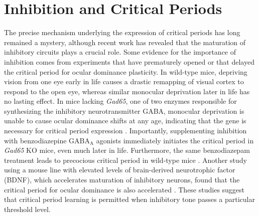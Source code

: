 \section{Inhibition and Critical Periods}
The precise mechanism underlying the expression of critical periods has long remained a mystery, although recent work has revealed that the maturation of inhibitory circuits plays a crucial role. Some evidence for the importance of inhibition comes from experiments that have prematurely opened or that delayed the critical period for ocular dominance plasticity. In wild-type mice, depriving vision from one eye early in life causes a drastic remapping of visual cortex to respond to the open eye, whereas similar monocular deprivation later in life has no lasting effect. In mice lacking \textit{Gad65}, one of two enzymes responsible for synthesizing the inhibitory neurotransmitter GABA, monocular deprivation is unable to cause ocular dominance shifts at any age, indicating that the gene is necessary for critical period expression \cite{Fagiolini2000}. Importantly, supplementing inhibition with benzodiazepine GABA$_\mathrm{A}$ agonists immediately initiates the critical period in \textit{Gad65} KO mice, even much later in life. Furthermore, the same benzodiazepam treatment leads to precocious critical period in wild-type mice \cite{Fagiolini2000}. Another study using a mouse line with elevated levels of brain-derived neurotrophic factor (BDNF), which accelerates maturation of inhibitory neurons, found that the critical period for ocular dominance is also accelerated \cite{Hanover1999, Huang1999}. These studies suggest that critical period learning is permitted when inhibitory tone passes a particular threshold level.

